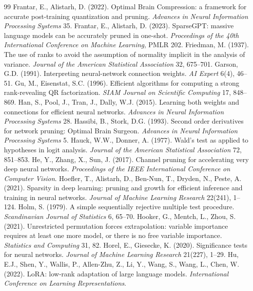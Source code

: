 \documentclass[11pt,a4paper]{article}
\theoremstyle{remark}\newtheorem{remark}{Remark}
\begin{document}
\begin{thebibliography}{99}
 Frantar, E., Alistarh, D. (2022). Optimal Brain Compression: a framework for accurate post-training quantization and pruning. \emph{Advances in Neural Information Processing Systems} 35.
 Frantar, E., Alistarh, D. (2023). SparseGPT: massive language models can be accurately pruned in one-shot. \emph{Proceedings of the 40th International Conference on Machine Learning}, PMLR 202.
 Friedman, M. (1937). The use of ranks to avoid the assumption of normality implicit in the analysis of variance. \emph{Journal of the American Statistical Association} 32, 675--701.
 Garson, G.D. (1991). Interpreting neural-network connection weights. \emph{AI Expert} 6(4), 46--51.
 Gu, M., Eisenstat, S.C. (1996). Efficient algorithms for computing a strong rank-revealing QR factorization. \emph{SIAM Journal on Scientific Computing} 17, 848--869.
 Han, S., Pool, J., Tran, J., Dally, W.J. (2015). Learning both weights and connections for efficient neural networks. \emph{Advances in Neural Information Processing Systems} 28.
 Hassibi, B., Stork, D.G. (1993). Second order derivatives for network pruning: Optimal Brain Surgeon. \emph{Advances in Neural Information Processing Systems} 5.
 Hauck, W.W., Donner, A. (1977). Wald's test as applied to hypotheses in logit analysis. \emph{Journal of the American Statistical Association} 72, 851--853.
 He, Y., Zhang, X., Sun, J. (2017). Channel pruning for accelerating very deep neural networks. \emph{Proceedings of the IEEE International Conference on Computer Vision}.
 Hoefler, T., Alistarh, D., Ben-Nun, T., Dryden, N., Peste, A. (2021). Sparsity in deep learning: pruning and growth for efficient inference and training in neural networks. \emph{Journal of Machine Learning Research} 22(241), 1--124.
 Holm, S. (1979). A simple sequentially rejective multiple test procedure. \emph{Scandinavian Journal of Statistics} 6, 65--70.
 Hooker, G., Mentch, L., Zhou, S. (2021). Unrestricted permutation forces extrapolation: variable importance requires at least one more model, or there is no free variable importance. \emph{Statistics and Computing} 31, 82.
 Horel, E., Giesecke, K. (2020). Significance tests for neural networks. \emph{Journal of Machine Learning Research} 21(227), 1--29.
 Hu, E.J., Shen, Y., Wallis, P., Allen-Zhu, Z., Li, Y., Wang, S., Wang, L., Chen, W. (2022). LoRA: low-rank adaptation of large language models. \emph{International Conference on Learning Representations}.

\end{thebibliography}
\end{document}
